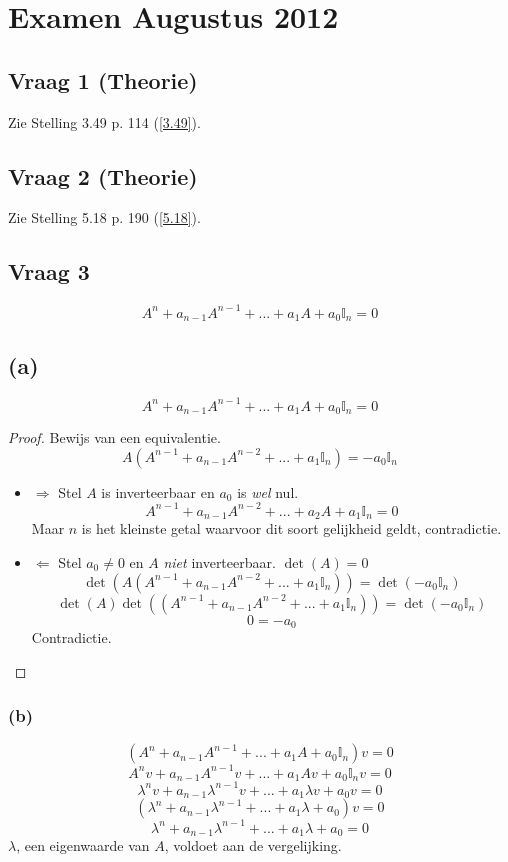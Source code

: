 \documentclass[lineaire_algebra_oplossingen.tex]{subfiles}
\begin{document}
\section{Examen Augustus 2012}

\subsection{Vraag 1 (Theorie)}
Zie Stelling 3.49 p. 114 (\ref{3.49}).

\subsection{Vraag 2 (Theorie)}
Zie Stelling 5.18 p. 190 (\ref{5.18}).

\subsection{Vraag 3}
\[
A^n + a_{n-1}A^{n-1} + ... + a_1A + a_0\mathbb{I}_n = 0
\]
\subsection*{(a)}
\[
A^n + a_{n-1}A^{n-1} + ... + a_1A + a_0\mathbb{I}_n = 0
\]
\begin{proof}
Bewijs van een equivalentie.
\[
A(A^{n-1} + a_{n-1}A^{n-2} + ... + a_1\mathbb{I}_n) = -a_0\mathbb{I}_n
\]
\begin{itemize}
\item $\Rightarrow$
Stel $A$ is inverteerbaar en $a_0$ is \emph{wel} nul.
\[
A^{n-1} + a_{n-1}A^{n-2} + ... + a_2A + a_1\mathbb{I}_n = 0
\]
Maar $n$ is het kleinste getal waarvoor dit soort gelijkheid geldt, contradictie.

\item $\Leftarrow$
Stel $a_0 \neq 0$ en $A$ \emph{niet} inverteerbaar. $\det(A) = 0$
\[
\det(A(A^{n-1} + a_{n-1}A^{n-2} + ... + a_1\mathbb{I}_n)) = \det(-a_0\mathbb{I}_n)
\]
\[
\det(A)\det((A^{n-1} + a_{n-1}A^{n-2} + ... + a_1\mathbb{I}_n)) = \det(-a_0\mathbb{I}_n)
\]
\[
0 = -a_0
\]
Contradictie.
\end{itemize}
\end{proof}

\subsubsection*{(b)}
\[
(A^n + a_{n-1}A^{n-1} + ... + a_1A + a_0\mathbb{I}_n)v = 0
\]
\[
A^nv + a_{n-1}A^{n-1}v + ... + a_1Av + a_0\mathbb{I}_nv = 0
\]
\[
\lambda^nv + a_{n-1}\lambda^{n-1}v + ... + a_1\lambda v + a_0v = 0
\]
\[
(\lambda^n + a_{n-1}\lambda^{n-1} + ... + a_1\lambda + a_0)v = 0
\]
\[
\lambda^n + a_{n-1}\lambda^{n-1} + ... + a_1\lambda + a_0 = 0
\]
$\lambda$, een eigenwaarde van $A$, voldoet aan de vergelijking.
\end{document}
